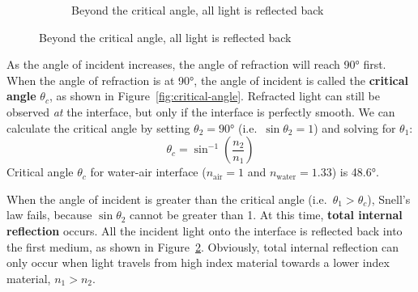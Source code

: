 \begin{figure}[ht]
\begin{subfigure}[t]{.32\linewidth}
    \caption{Beyond the critical angle, all light is reflected back}
    \label{fig:TIR}
  \end{subfigure}
\end{figure}
As the angle of incident increases, the angle of refraction will reach \ang{90}
first. When the angle of refraction is at \ang{90}, the angle of incident is
called the \textbf{critical angle} $\theta_c$, as shown in
Figure~\ref{fig:critical-angle}. Refracted light can still be observed
\emph{at} the interface, but only if the interface is perfectly smooth. We can
calculate the critical angle by setting $\theta_2=\ang{90}$ (i.e.\
$\sin\theta_2=1$) and solving for $\theta_1$:
\begin{equation}
  \boxed{
    \theta_c=\sin^{-1}\left(\frac{n_2}{n_1}\right)
  }
\end{equation}
Critical angle $\theta_c$ for water-air interface ($n_\text{air}=1$ and
$n_\text{water}=1.33$) is \ang{48.6}.

When the angle of incident is greater than the critical angle (i.e.\
$\theta_1>\theta_c$), Snell's law fails, because $\sin\theta_2$ cannot be
greater than 1. At this time, \textbf{total internal reflection} occurs. All
the incident light onto the interface is reflected back into the first medium,
as shown in Figure~\ref{fig:TIR}. Obviously, total internal reflection can only
occur when light travels from high index material towards a lower index
material, $n_1>n_2$.




